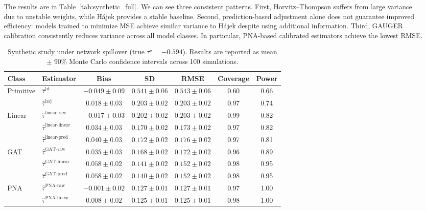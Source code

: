 \documentclass[twoside,letterpaper]{article}
\theoremstyle{plain}
\theoremstyle{definition}
\theoremstyle{remark}
\begin{document}
The results are in Table~\ref{tab:synthetic_full}. We can see three consistent patterns. First, Horvitz--Thompson suffers from large variance due to unstable weights, while H\'{a}jek provides a stable baseline. Second, prediction-based adjustment alone does not guarantee improved efficiency: models trained to minimize MSE achieve similar variance to H\'{a}jek despite using additional information. Third, GAUGER calibration consistently reduces variance across all model classes. In particular, PNA-based calibrated estimators achieve the lowest RMSE.
\begin{table}[htbp]
\centering
\caption{Synthetic study under network spillover (true $\tau^\star = -0.594$). Results are reported as mean $\pm$ 90\% Monte Carlo confidence intervals across 100 simulations.}
\footnotesize
\begin{tabular}{ll|ccc|cc}
\toprule
Class & Estimator & Bias & SD & RMSE & Coverage & Power \\
\midrule
\multirow{2}{*}{Primitive}
& $\hat{\tau}^{\text{ht}}$ 
& $-0.049 \pm 0.09$ & $0.541 \pm 0.06$ & $0.543 \pm 0.06$ & 0.60 & 0.66 \\
& $\hat{\tau}^{\text{haj}}$ 
& $0.018 \pm 0.03$ & $0.203 \pm 0.02$ & $0.203 \pm 0.02$ & 0.97 & 0.74 \\
\midrule
\multirow{3}{*}{Linear}
& $\hat{\tau}^{\text{linear-raw}}$ 
& $-0.017 \pm 0.03$ & $0.202 \pm 0.02$ & $0.203 \pm 0.02$ & 0.99 & 0.82 \\
& $\hat{\tau}^{\text{linear-linear}}$ 
& $0.034 \pm 0.03$ & $0.170 \pm 0.02$ & $0.173 \pm 0.02$ & 0.97 & 0.82 \\
& $\hat{\tau}^{\text{linear-pred}}$ 
& $0.040 \pm 0.03$ & $0.172 \pm 0.02$ & $0.176 \pm 0.02$ & 0.97 & 0.81 \\
\midrule
\multirow{3}{*}{GAT}
& $\hat{\tau}^{\text{GAT-raw}}$ 
& $0.035 \pm 0.03$ & $0.168 \pm 0.02$ & $0.172 \pm 0.02$ & 0.96 & 0.89 \\
& $\hat{\tau}^{\text{GAT-linear}}$ 
& $0.058 \pm 0.02$ & $0.141 \pm 0.02$ & $0.152 \pm 0.02$ & 0.98 & 0.95 \\
& $\hat{\tau}^{\text{GAT-pred}}$ 
& $0.058 \pm 0.02$ & $0.140 \pm 0.02$ & $0.152 \pm 0.02$ & 0.98 & 0.95 \\
\midrule
\multirow{3}{*}{PNA}
& $\hat{\tau}^{\text{PNA-raw}}$ 
& $\mathbf{-0.001 \pm 0.02}$ & $\mathbf{0.127 \pm 0.01}$ & $\mathbf{0.127 \pm 0.01}$ & 0.97 & 1.00 \\
& $\hat{\tau}^{\text{PNA-linear}}$ 
& $\mathbf{0.008 \pm 0.02}$ & $\mathbf{0.125 \pm 0.01}$ & $\mathbf{0.125 \pm 0.01}$ & 0.98 & 1.00 \\

\end{tabular}
\end{table}
\end{document}
